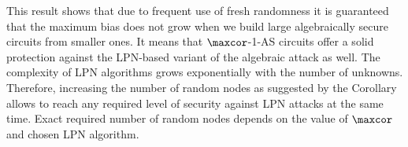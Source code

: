 This result shows that due to frequent use of fresh randomness it is guaranteed that the maximum bias does not grow when we build large algebraically secure circuits from smaller ones. It means that $\maxcor$-1-AS circuits offer a solid protection against the LPN-based variant of the algebraic attack as well. The complexity of LPN algorithms grows exponentially with the number of unknowns. Therefore, increasing the number of random nodes as suggested by the Corollary~ allows to reach any required level of security against LPN attacks at the same time. Exact required number of random nodes depends on the value of $\maxcor$ and chosen LPN algorithm.